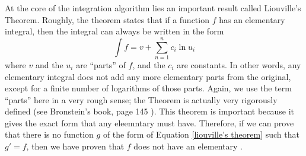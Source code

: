 At the core of the \gls{integration} algorithm lies an important result
called Liouville's Theorem.  Roughly, the theorem states that if a
function $f$ has an \gls{elementary} integral, then the integral can
always be written in the form
\begin{equation}
\label{liouville's theorem}
\int{f} = v + \sum_{n=1}^n{c_i\ln{u_i}}
\end{equation}
where $v$ and the $u_i$ are ``parts'' of $f$, and the $c_i$ are
constants.  In other words, any \gls{elementary} integral does not add
any more \gls{elementary} parts from the original, except for a finite
number of logarithms of those parts.  Again, we use the term ``parts''
here in a very rough sense; the Theorem is actually very rigorously
defined (see Bronstein's book, page 145 \cite{bronstein2005symbolic}). 
This theorem is important because it gives the exact form that any
eleemntary \antiderivative must have. Therefore, if we can prove that
there is no function $g$ of the form of Equation \ref{liouville's
theorem} such that $g'=f$, then we have proven that $f$ does not have an
\gls{elementary} \antiderivative. 